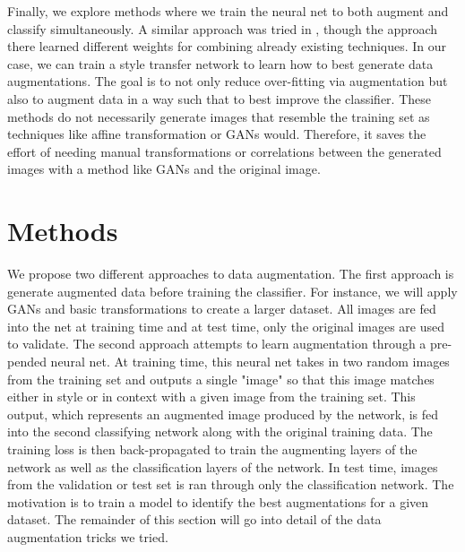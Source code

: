 \documentclass[10pt,twocolumn,letterpaper]{article}
\begin{document}
Finally, we explore methods where we train the neural net to both augment and classify simultaneously. A similar approach was tried in \cite{smart_augmentation}, though the approach there learned different weights for combining already existing techniques. In our case, we can train a style transfer network to learn how to best generate data augmentations. The goal is to not only reduce over-fitting via augmentation but also to augment data in a way such that to best improve the classifier. These methods do not necessarily generate images that resemble the training set as techniques like affine transformation or GANs would. Therefore, it saves the effort of needing manual transformations or correlations between the generated images with a method like GANs and the original image. 

\section{Methods}

We propose two different approaches to data augmentation. The first approach is generate augmented data before training the classifier. For instance, we will apply GANs and basic transformations to create a larger dataset. All images are fed into the net at training time and at test time, only the original images are used to validate. The second approach attempts to learn augmentation through a pre-pended neural net. At training time, this neural net takes in two random images from the training set and outputs a single "image" so that this image matches either in style or in context with a given image from the training set. This output, which represents an augmented image produced by the network, is fed into the second classifying network along with the original training data. The training loss is then back-propagated to train the augmenting layers of the network as well as the classification layers of the network. In test time, images from the validation or test set is ran through only the classification network. The motivation is to train a model to identify the best augmentations for a given dataset. The remainder of this section will go into detail of the data augmentation tricks we tried. \\
\end{document}
